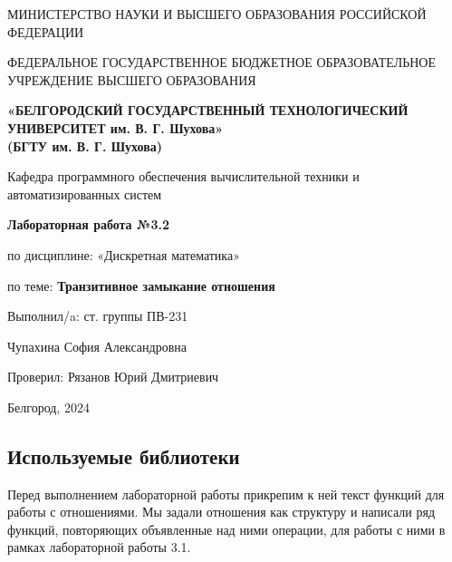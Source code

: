 \documentclass[12pt]{article}
\begin{document}
	\begin{center}
		{\parskip=1cm
			МИНИСТЕРСТВО НАУКИ И ВЫСШЕГО ОБРАЗОВАНИЯ РОССИЙСКОЙ ФЕДЕРАЦИИ
			
			ФЕДЕРАЛЬНОЕ ГОСУДАРСТВЕННОЕ БЮДЖЕТНОЕ ОБРАЗОВАТЕЛЬНОЕ УЧРЕЖДЕНИЕ ВЫСШЕГО ОБРАЗОВАНИЯ
			
			{\bf«БЕЛГОРОДСКИЙ ГОСУДАРСТВЕННЫЙ ТЕХНОЛОГИЧЕСКИЙ УНИВЕРСИТЕТ им. В. Г. Шухова»\\(БГТУ им. В. Г. Шухова)}
			
			\begin{figure}[bh]
				\noindent{}
			\end{figure}
			Кафедра программного обеспечения вычислительной техники и автоматизированных систем
		}
		
		{\Large 
			\vspace{1cm}
			{\parskip=0.25cm 
				{\bf Лабораторная работа №3.2}
				
				по дисциплине: «Дискретная математика»

				по теме: {\bf Транзитивное замыкание отношения}
			}
		}
	\end{center}	
	\begin{flushleft}
		{\leftskip=10cm
			{\vspace{3cm} Выполнил/a: ст. группы ПВ-231}
			
			Чупахина София Александровна
			
			Проверил: Рязанов Юрий Дмитриевич
			
		}
	\end{flushleft}
	\begin{center}
		{\parskip=3cm Белгород, 2024}
	\end{center}
	\newpage
	
	\tableofcontents
	\newpage
	
	\subsection{Используемые библиотеки}
	\label{libraries}
	Перед выполнением лабораторной работы прикрепим к ней текст функций для работы с отношениями. Мы задали отношения как структуру и написали ряд функций, повторяющих объявленные над ними операции, для работы с ними в рамках лабораторной работы 3.1. 
	
\end{document}

